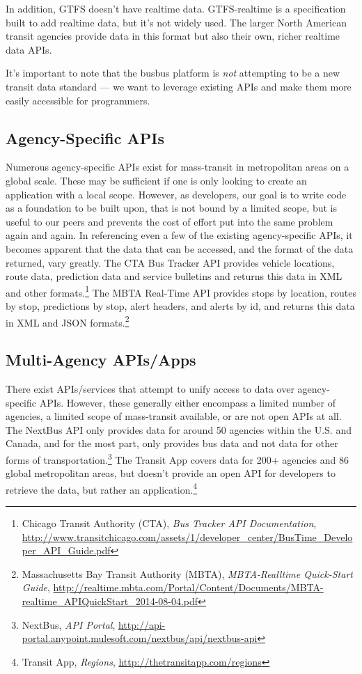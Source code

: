 \documentclass[12pt]{article}
\begin{document}
In addition, GTFS doesn't have realtime data. GTFS-realtime is a specification built to add
realtime data, but it's not widely used. The larger North American transit agencies provide
data in this format but also their own, richer realtime data APIs.

It's important to note that the busbus platform is \textit{not} attempting to be a new transit data standard ---
we want to leverage existing APIs and make them more easily accessible for programmers.

\subsection{Agency-Specific APIs}

Numerous agency-specific APIs exist for mass-transit in metropolitan areas on a global scale.
These may be sufficient if one is only looking to create an application with a local scope. However,
as developers, our goal is to write code as a foundation to be built upon, that is not bound by a
limited scope, but is useful to our peers and prevents the cost of effort put into the same 
problem again and again. In referencing even a few of the existing agency-specific APIs, it
becomes apparent that the data that can be accessed, and the format of the data returned, 
vary greatly. The CTA Bus Tracker API provides vehicle locations, route data, prediction data and 
service bulletins and returns this data in XML and other formats.\footnote{Chicago Transit Authority (CTA), \textit{Bus Tracker API Documentation},
\url{http://www.transitchicago.com/assets/1/developer\_center/BusTime\_Developer\_API\_Guide.pdf}} The MBTA Real-Time API provides
stops by location, routes by stop, predictions by stop, alert headers, and alerts by id, and returns 
this data in XML and JSON formats.\footnote{Massachusetts Bay Transit Authority (MBTA), \textit{MBTA-Realltime Quick-Start Guide},
\url{http://realtime.mbta.com/Portal/Content/Documents/MBTA-realtime\_APIQuickStart\_2014-08-04.pdf}}

\subsection{Multi-Agency APIs/Apps}
There exist APIs/services that attempt to unify access to data over agency-specific APIs.
However, these generally either encompass a limited number of agencies, a limited scope
of mass-transit available, or are not open APIs at all. The NextBus API only provides data for
around 50 agencies within the U.S. and Canada, and for the most part, only provides bus data 
and not data for other forms of transportation.\footnote{NextBus, \textit{API Portal}, \url{http://api-portal.anypoint.mulesoft.com/nextbus/api/nextbus-api}} The Transit App covers data for 200+ agencies
and 86 global metropolitan areas, but doesn't provide an open API for developers to retrieve the
data, but rather an application.\footnote{Transit App, \textit{Regions}, \url{http://thetransitapp.com/regions}}
\end{document}
